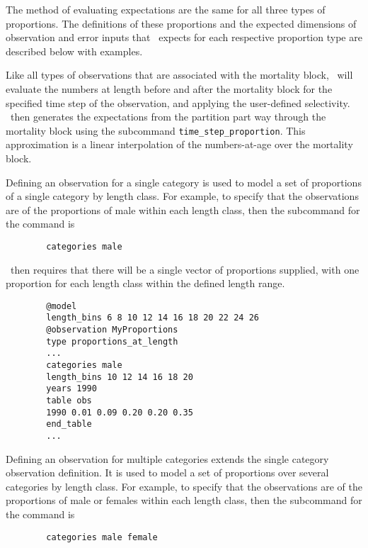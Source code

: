 The method of evaluating expectations are the same for all three types of proportions. The definitions of these proportions and the expected dimensions of observation and error inputs that \CNAME\ expects for each respective proportion type are described below with examples.

Like all types of observations that are associated with the mortality block, \CNAME\ will evaluate the numbers at length before and after the mortality block for the specified time step of the observation, and applying the user-defined selectivity. \CNAME\ then generates the expectations from the partition part way through the mortality block using the subcommand \texttt{time\_step\_proportion}. This approximation is a linear interpolation of the numbers-at-age over the mortality block.

Defining an observation for a single category is used to model a set of proportions of a single category by length class. For example, to specify that the observations are of the proportions of male within each length class, then the subcommand  for the  command is

{\small{\begin{verbatim}
		categories male
		\end{verbatim}}}

\CNAME\ then requires that there will be a single vector of proportions supplied, with one proportion for each length class within the defined length range.


{\small{\begin{verbatim}
		@model
		length_bins 6 8 10 12 14 16 18 20 22 24 26
		@observation MyProportions
		type proportions_at_length
		...
		categories male
		length_bins 10 12 14 16 18 20
		years 1990
		table obs
		1990 0.01 0.09 0.20 0.20 0.35 
		end_table
		...
		\end{verbatim}}}

Defining an observation for multiple categories extends the single category observation definition. It is used to model a set of proportions over several categories by length class. For example, to specify that the observations are of the proportions of male or females within each length class, then the subcommand  for the  command is

{\small{\begin{verbatim}
		categories male female
		\end{verbatim}}}

